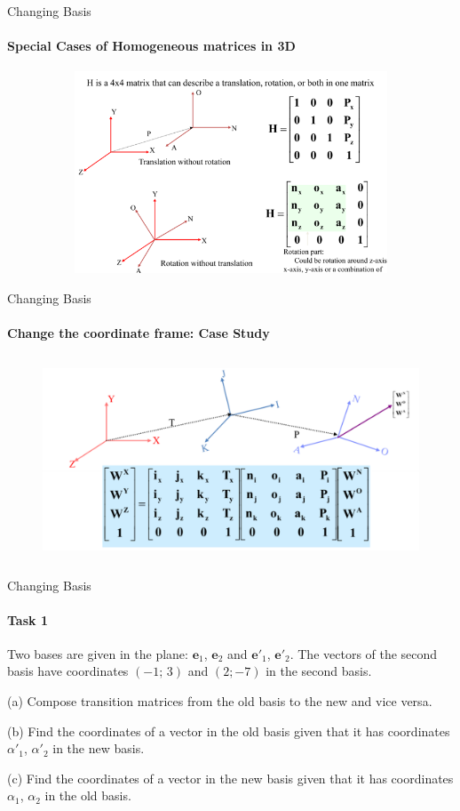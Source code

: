 \documentclass[aspectratio=169,notes]{beamer}
\begin{document}
    \begin{frame}[t]{Changing Basis}
        \framesubtitle{Special Cases of Homogeneous matrices in 3D}
        \vspace{-0.6cm}
            \begin{figure}[H]
                \centering\includegraphics[height=6cm,width=1\textwidth,keepaspectratio]{change_klimchik_3.png}
                \label{fig:change_klimchik_3.png}
            \end{figure}
        \end{frame}
    
        \begin{frame}[t]{Changing Basis}
            \framesubtitle{Change the coordinate frame: Case Study}
            \vspace{-0.6cm}
                \begin{figure}[H]
                    \centering\includegraphics[height=6cm,width=1\textwidth,keepaspectratio]{change_klimchik_4.png}
                    \label{fig:change_klimchik_4.png}
                \end{figure}
            \end{frame}

\begin{frame}[t]{Changing Basis}
\framesubtitle{Task 1}
Two bases are given in the plane: $\textbf{e}_1$, $\textbf{e}_2$ and $\textbf{e}'_1$, $\textbf{e}'_2$. The vectors of the second basis have coordinates $(-1;\,3)$ and $(2;-7)$ in the second basis.

(a) Compose transition matrices from the old basis to the new and vice versa.

(b) Find the coordinates of a vector in the old basis given that it has coordinates $\alpha'_1$, $\alpha'_2$ in the new basis.

(c) Find the coordinates of a vector in the new basis given that it has coordinates $\alpha_1$, $\alpha_2$ in the old basis.
\end{frame}
\end{document}
